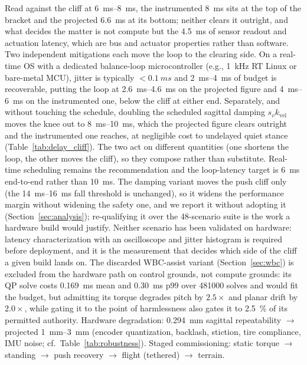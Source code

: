 \documentclass[a4paper,fleqn]{cas-dc}
\begin{document}
Read against the cliff at \SIrange{6}{8}{ms}, the instrumented \SI{8}{ms} sits at the top of the bracket and the projected \SI{6.6}{ms} at its bottom; neither clears it outright, and what decides the matter is not compute but the \SI{4.5}{ms} of sensor readout and actuation latency, which are bus and actuator properties rather than software. Two independent mitigations each move the loop to the clearing side. On a real-time OS with a dedicated balance-loop microcontroller (e.g., \SI{1}{kHz} RT Linux or bare-metal MCU), jitter is typically ${<}\SI{0.1}{ms}$ and \SIrange{2}{4}{ms} of budget is recoverable, putting the loop at \SIrange{2.6}{4.6}{ms} on the projected figure and \SIrange{4}{6}{ms} on the instrumented one, below the cliff at either end. Separately, and without touching the schedule, doubling the scheduled sagittal damping $s_v k_{\text{vel}}$ moves the knee out to \SIrange{8}{10}{ms}, which the projected figure clears outright and the instrumented one reaches, at negligible cost to undelayed quiet stance (Table~\ref{tab:delay_cliff}). The two act on different quantities (one shortens the loop, the other moves the cliff), so they compose rather than substitute. Real-time scheduling remains the recommendation and the loop-latency target is \SI{6}{ms} end-to-end rather than \SI{10}{ms}. The damping variant moves the push cliff only (the \SIrange{14}{16}{ms} fall threshold is unchanged), so it widens the performance margin without widening the safety one, and we report it without adopting it (Section~\ref{sec:analysis}); re-qualifying it over the \num{48}-scenario suite is the work a hardware build would justify. Neither scenario has been validated on hardware: latency characterization with an oscilloscope and jitter histogram is required before deployment, and it is the measurement that decides which side of the cliff a given build lands on. The discarded WBC-assist variant (Section~\ref{sec:wbc}) is excluded from the hardware path on control grounds, not compute grounds: its QP solve costs \SI{0.169}{ms} mean and \SI{0.30}{ms} p99 over \num{481000} solves and would fit the budget, but admitting its torque degrades pitch by $\num{2.5}\times$ and planar drift by $\num{2.0}\times$, while gating it to the point of harmlessness also gates it to \SI{2.5}{\percent} of its permitted authority. Hardware degradation: \SI{0.294}{mm} sagittal repeatability $\rightarrow$ projected \SIrange{1}{3}{mm} (encoder quantization, backlash, stiction, tire compliance, IMU noise; cf.\ Table~\ref{tab:robustness}). Staged commissioning: static torque $\rightarrow$ standing $\rightarrow$ push recovery $\rightarrow$ flight (tethered) $\rightarrow$ terrain.
\end{document}
